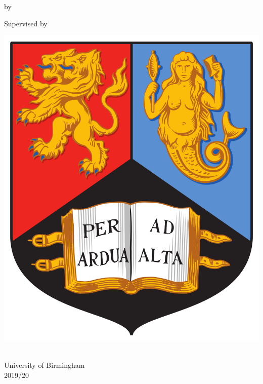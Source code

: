 \begin{titlepage}
    \begin{center}

        \vspace{3cm}
        \Huge
        \textbf{\thetitle}

        \vspace{0.5cm}
        \LARGE
        by

        \vspace{0.5cm}

        \textbf{\theauthor}

		\vspace{1cm}
		\LARGE
		Supervised by

		\vspace{0.5cm}
		\textbf{\supervisor}

		\vspace{1.5cm}
        \includegraphics[scale=0.15]{university-crest}

        \textbf{\degree}

        \end{center}

        \raggedleft
        \Large
                      \school \\
                      University of Birmingham \\
                      2019/20

\end{titlepage}